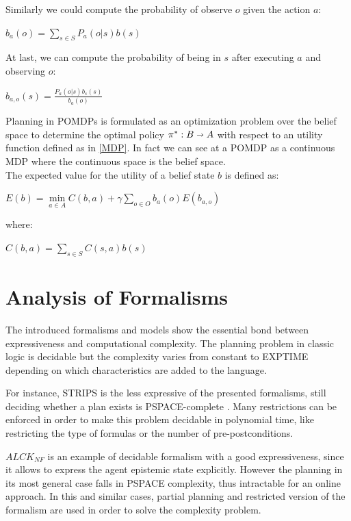 \documentclass[pdftex,12pt,a4paper]{report}
\begin{document}
\noindent Similarly we could compute the probability of observe $o$ given the action $a$:
\begin{center}
\noindent $b_a(o) = \sum\limits_{s \in S} P_a(o|s)b(s)$ 
\end{center}

\noindent At last, we can compute the probability of being in $s$ after executing $a$ and observing $o$:
\begin{center}
\noindent $b_{a,o}(s) = \frac{P_a(o|s)b_s(s)}{b_a(o)}$ 
\end{center}

\noindent Planning in POMDPs is formulated as an optimization problem over the belief space to determine the optimal policy $\pi^* : B \shortrightarrow A$ with respect to an utility function defined as in \ref{MDP}. In fact we can see at a POMDP as a continuous MDP where the continuous space is the belief space.
\\\noindent The expected value for the utility of a belief state $b$ is defined as:
\begin{center}
\noindent $E(b) = \min\limits_{a \in A} C(b,a) + \gamma \sum\limits_{o \in O}b_a(o)E(b_{a,o})$ 
\end{center}
\noindent where:
\begin{center}
\noindent $C(b,a) = \sum\limits_{s \in S}C(s,a)b(s)$ 
\end{center}

\section{Analysis of Formalisms}\label{sec:analysis}
The introduced formalisms and models show the essential bond between expressiveness and computational complexity. The planning problem in classic logic is decidable but the complexity varies from constant to EXPTIME depending on which characteristics are added to the language. 
\newline

\noindent For instance, STRIPS is the less expressive of the presented formalisms, still deciding whether a plan exists is PSPACE-complete \cite{bylander1994computational}.%
Many restrictions can be enforced in order to make this problem decidable in polynomial time, like restricting the type of formulas or the number of pre-postconditions. 
\newline

\noindent $ALCK_{NF}$ is an example of decidable formalism with a good expressiveness, since it allows to express the agent epistemic state explicitly. However the planning in its most general case falls in PSPACE complexity, thus intractable for an online approach. In this and similar cases, partial planning and restricted version of the formalism are used in order to solve the complexity problem.
\newline
\end{document}
